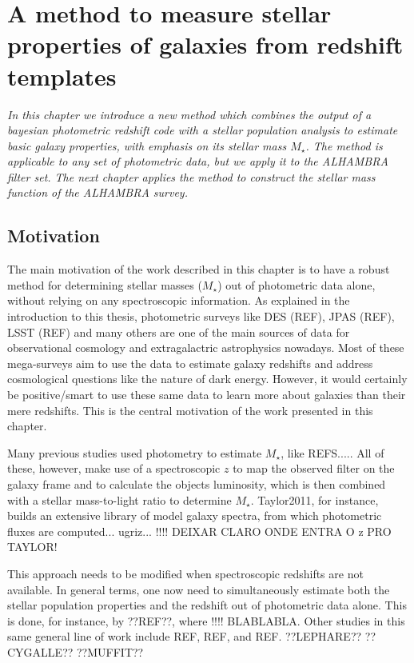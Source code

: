 \documentclass[9pt]{memoir}
\begin{document}
\chapter[BLABLABLA]{A method to measure stellar properties of galaxies from redshift templates}


{\em
In this chapter we introduce a new method which combines the output of a bayesian  photometric redshift code with a stellar population analysis to estimate basic galaxy properties, with emphasis on its stellar mass $M_\star$. The method is applicable to any set of photometric data, but we apply it to the ALHAMBRA filter set. The next chapter applies the method to construct the stellar mass function of the ALHAMBRA survey.
}

\section{Motivation}
\label{sec:motivation}

The main motivation of the work described in this chapter is to have a robust method for determining stellar masses ($M_\star$) out of photometric data alone, without relying on any spectroscopic information. As explained in the introduction to this thesis, photometric surveys like DES (REF), JPAS (REF), LSST (REF) and many others are one of the main sources of data for observational cosmology and extragalactric astrophysics nowadays. Most of these mega-surveys aim to use the data to estimate galaxy redshifts and address cosmological questions like the nature of dark energy. However, it would certainly be positive/smart to use these same data to learn more about galaxies than their mere redshifts. This is the central motivation of the work presented in this chapter.


Many previous studies used photometry to estimate $M_\star$, like REFS.....
All of these, however, make use of a spectroscopic $z$ to map the observed filter on the galaxy frame and to calculate the objects luminosity, which is then combined with a stellar mass-to-light ratio to determine $M_\star$. Taylor2011, for instance, builds an extensive library of model galaxy spectra, from which photometric fluxes are computed... ugriz... !!!! DEIXAR CLARO ONDE ENTRA O z PRO TAYLOR!


This approach needs to be modified when spectroscopic redshifts are not available. In general terms, one now need to simultaneously estimate both the stellar population properties and the redshift out of photometric data alone.
This is done, for instance, by ??REF??, where !!!! BLABLABLA. Other studies in this same general line of work include REF, REF, and REF.  ??LEPHARE?? ??CYGALLE?? ??MUFFIT??
\end{document}
